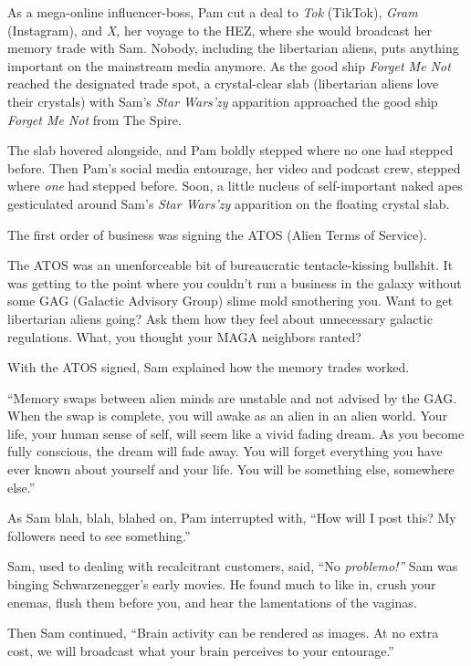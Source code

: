 As a mega-online influencer-boss, Pam cut a deal to \emph{Tok} (TikTok),
\emph{Gram} (Instagram), and \emph{X,} her voyage to the HEZ, where she
would broadcast her memory trade with Sam. Nobody, including the
libertarian aliens, puts anything important on the mainstream media
anymore. As the good ship \emph{Forget Me Not} reached the designated
trade spot, a crystal-clear slab (libertarian aliens love their
crystals) with Sam's \emph{Star Wars'zy} apparition approached the good
ship \emph{Forget Me Not} from The Spire.

The slab hovered alongside, and Pam boldly stepped where no one had
stepped before. Then Pam's social media entourage, her video and podcast
crew, stepped where \emph{one} had stepped before. Soon, a little
nucleus of self-important naked apes gesticulated around Sam's
\emph{Star Wars'zy} apparition on the floating crystal slab.

The first order of business was signing the ATOS (Alien Terms of
Service).

The ATOS was an unenforceable bit of bureaucratic tentacle-kissing
bullshit. It was getting to the point where you couldn't run a business
in the galaxy without some GAG (Galactic Advisory Group) slime mold
smothering you. Want to get libertarian aliens going? Ask them how they
feel about unnecessary galactic regulations. What, you thought your MAGA
neighbors ranted?

With the ATOS signed, Sam explained how the memory trades worked.

``Memory swaps between alien minds are unstable and not advised by the
GAG. When the swap is complete, you will awake as an alien in an alien
world. Your life, your human sense of self, will seem like a vivid
fading dream. As you become fully conscious, the dream will fade away.
You will forget everything you have ever known about yourself and your
life. You will be something else, somewhere else.''

As Sam blah, blah, blahed on, Pam interrupted with, ``How will I post
this? My followers need to see something.''

Sam, used to dealing with recalcitrant customers, said, ``No
\emph{problemo!''} Sam was binging Schwarzenegger's early movies. He
found much to like in, crush your enemas, flush them before you, and
hear the lamentations of the vaginas.

Then Sam continued, ``Brain activity can be rendered as images. At no
extra cost, we will broadcast what your brain perceives to your
entourage.''

